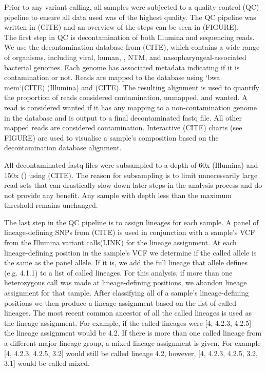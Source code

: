Prior to any variant calling, all samples were subjected to a quality control (QC) pipeline to ensure all data used was of the highest quality. The QC pipeline was written in (CITE) and an overview of the steps can be seen in (FIGURE). \\
The first step in QC is decontamination of both Illumina and \ont{} sequencing reads. We use the decontamination database from (CITE), which contains a wide range of organisms, including viral, human, \mtb{}, NTM, and nasopharyngeal-associated bacterial genomes. Each genome has associated metadata indicating if it is contamination or not. Reads are mapped to the database using `bwa mem`(CITE) (Illumina) and (CITE). The resulting alignment is used to quantify the proportion of reads considered contamination, unmapped, and wanted. A read is considered wanted if it has any mapping to a non-contamination genome in the database and is output to a final decontaminated fastq file. All other mapped reads are considered contamination. Interactive (CITE) charts (see FIGURE) are used to visualise a sample's composition based on the decontamination database alignment.  

All decontaminated fastq files were subsampled to a depth of 60x (Illumina) and 150x (\ont{}) using (CITE). The reason for subsampling is to limit unnecessarily large read sets that can drastically slow down later steps in the analysis process and do not provide any benefit. Any sample with depth less than the maximum threshold remains unchanged.  

The last step in the QC pipeline is to assign lineages for each sample. A panel of lineage-defining SNPs from (CITE) is used in conjunction with a sample's VCF from the Illumina variant calls(LINK) for the lineage assignment. At each lineage-defining position in the sample's VCF we determine if the called allele is the same as the panel allele. If it is, we add the full lineage that allele defines (e.g. 4.1.1) to a list of called lineages. For this analysis, if more than one heterozygous call was made at lineage-defining positions, we abandon lineage assignment for that sample. After classifying all of a sample's lineage-defining positions we then produce a lineage assignment based on the list of called lineages. The most recent common ancestor of all the called lineages is used as the lineage assignment. For example, if the called lineages were [4, 4.2.3, 4.2.5] the lineage assignment would be 4.2. If there is more than one called lineage from a different major lineage group, a mixed lineage assignment is given. For example [4, 4.2.3, 4.2.5, 3.2] would still be called lineage 4.2, however, [4, 4.2.3, 4.2.5, 3.2, 3.1] would be called mixed.

